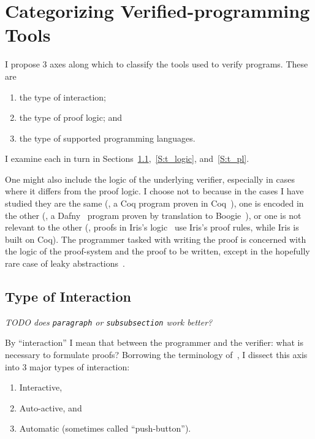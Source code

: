 \section{Categorizing Verified-programming Tools}\label{S:categories}

I propose 3 axes along which to classify the tools used to verify programs.
These are
\begin{enumerate}
    \item the type of interaction;
    \item the type of proof logic; and
    \item the type of supported programming languages.
\end{enumerate}

I examine each in turn in Sections~\ref{S:t_interaction},~\ref{S:t_logic},
and~\ref{S:t_pl}.

One might also include the logic of the underlying verifier, especially in cases
where it differs from the proof logic. I choose not to because in the cases I
have studied they are the same (\eg, a Coq program proven in Coq~\cite{Coq}),
one is encoded in the other (\eg, a Dafny~\cite{leino2010dafny} program proven
by translation to Boogie~\cite{Barnett_2006,leino2008this}), or one is not
relevant to the other (\eg, proofs in Iris's logic~\cite{Jung_2018b} use Iris's
proof rules, while Iris is built on Coq). The programmer tasked with writing the
proof is concerned with the logic of the proof-system and the proof to be
written, except in the hopefully rare case of leaky
abstractions~\cite{Spolsky_2002}.

\subsection{Type of Interaction}\label{S:t_interaction}

\emph{TODO does \texttt{paragraph} or \texttt{subsubsection} work better?}

By ``interaction'' I mean that between the programmer and the verifier: what is
necessary to formulate proofs? Borrowing the terminology of~\cite[\S 2]{Nelson_2019},
I dissect this axis into 3 major types of interaction:
\begin{enumerate}
    \item Interactive,
    \item Auto-active, and
    \item Automatic (sometimes called ``push-button'').
\end{enumerate}

